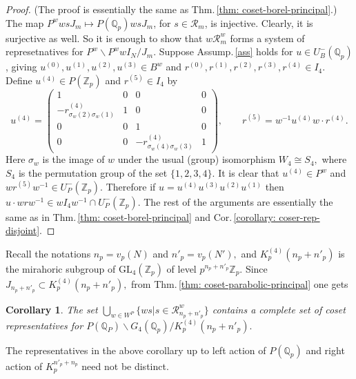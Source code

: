\documentclass[11pt]{amsart}
\newtheorem{corollary}{Corollary}[section]
\newcommand{\GL}{\mathrm{GL}}
\newcommand{\mirp}[1]{K_p^{(4)}(#1)}
\begin{document}
\begin{proof}
(The proof is essentially the same as Thm.\,\ref{thm: coset-borel-principal}.)
The map $P^w w s J_m \mapsto P(\mathbb{Q}_p)ws J_m$, for $s \in \mathcal{R}_m$, is injective. Clearly, it is surjective as well. 
So it is enough to show that $w\mathcal{R}_m^w$ forms a system of represetnatives for $P^w \backslash P^w w I_N/ J_m.$ 
Suppose Assump.\,\ref{ass} holds for $u \in U_B^{-}(\mathbb{Q}_p)$, giving 
$u^{(0)}, u^{(1)}, u^{(2)}, u^{(3)} \in B^w$ and $r^{(0)}, r^{(1)}, r^{(2)}, r^{(3)}, r^{(4)} \in I_4$. Define $u^{(4)} \in P(\mathbb{Z}_p)$ and $r^{(5)} \in I_4$ by
	\begin{equation*}
		u^{(4)} = \left(\begin{smallmatrix}
			1 & 0 & 0 & 0 \\
			-r^{(4)}_{\sigma_w(2)\sigma_w(1)} & 1 & 0 & 0\\
			0 & 0 & 1 & 0\\
			0 & 0 & -r^{(4)}_{\sigma_w(4)\sigma_w(3)} & 1
		\end{smallmatrix}\right), \qquad 
		r^{(5)} = w^{-1}u^{(4)}w \cdot r^{(4)}.
	\end{equation*}
Here $\sigma_w$ is the image of $w$ under the usual (group) isomorphism $W_4 \cong S_4,$ where $S_4$ is the permutation group of the set $\{1,2,3,4\}$.  It is clear that $u^{(4)} \in P^w$ and $w r^{(5)} w ^{-1} \in U_P^{-}(\mathbb{Z}_p).$ Therefore if $u = u^{(4)}u^{(3)}u^{(2)}u^{(1)}$ then 
$u \cdot w r w^{-1} \in w I_4 w^{-1} \cap U_P^{-}(\mathbb{Z}_p).$ The rest of the arguments are essentially the same as in 
Thm.\,\ref{thm: coset-borel-principal} and Cor.\,\ref{corollary: coser-rep-disjoint}.
\end{proof}

Recall the notations $n_p = v_p(N)$ and $ n'_p = v_p(N'),$ and $\mirp{n_p + n'_p}$ is the mirahoric subgroup of $\GL_4(\mathbb{Z}_p)$ of level 
$p^{n_p+n'_p}\mathbb{Z}_p$. Since $J_{n_p +n'_p} \subset \mirp{n_p+n'_p},$ from Thm.\,\ref{thm: coset-parabolic-principal} one gets

\begin{corollary}
	The set $\bigcup_{w\in W^P} \{ws | s \in \mathcal{R}_{n_p+n'_p}^w\}$ contains a complete set of coset representatives for 
	$P(\mathbb{Q}_P) \backslash G_4(\mathbb{Q}_p) / \mirp{n_p+n'_p}.$ 
\label{corollary: abstract-reprsentatives}
\end{corollary}
The representatives in the above corollary up to left action of $P(\mathbb{Q}_p)$ and right action of 
$K_p^{n'_p + n_p}$ need not be distinct. 
\end{document}

